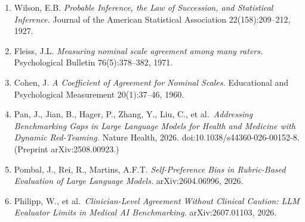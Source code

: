 \documentclass[
  11pt,
]{article}
\providecommand{\tightlist}{%
  \setlength{\itemsep}{0pt}\setlength{\parskip}{0pt}}
\begin{document}
\begin{enumerate}
  \begin{enumerate}
  \def\labelenumii{\arabic{enumii}.}
  \setcounter{enumii}{2024}
  \tightlist
  \item
  \end{enumerate}
\item
  Wilson, E.B. \emph{Probable Inference, the Law of Succession, and
  Statistical Inference.} Journal of the American Statistical
  Association 22(158):209--212, 1927.
\item
  Fleiss, J.L. \emph{Measuring nominal scale agreement among many
  raters.} Psychological Bulletin 76(5):378--382, 1971.
\item
  Cohen, J. \emph{A Coefficient of Agreement for Nominal Scales.}
  Educational and Psychological Measurement 20(1):37--46, 1960.
\item
  Pan, J., Jian, B., Hager, P., Zhang, Y., Liu, C., et
  al.~\emph{Addressing Benchmarking Gaps in Large Language Models for
  Health and Medicine with Dynamic Red-Teaming.} Nature Health, 2026.
  doi:10.1038/s44360-026-00152-8. (Preprint arXiv:2508.00923.)
\item
  Pombal, J., Rei, R., Martins, A.F.T. \emph{Self-Preference Bias in
  Rubric-Based Evaluation of Large Language Models.} arXiv:2604.06996,
  2026.
\item
  Philipp, W., et al.~\emph{Clinician-Level Agreement Without Clinical
  Caution: LLM Evaluator Limits in Medical AI Benchmarking.}
  arXiv:2607.01103, 2026.
\end{enumerate}
\end{document}
